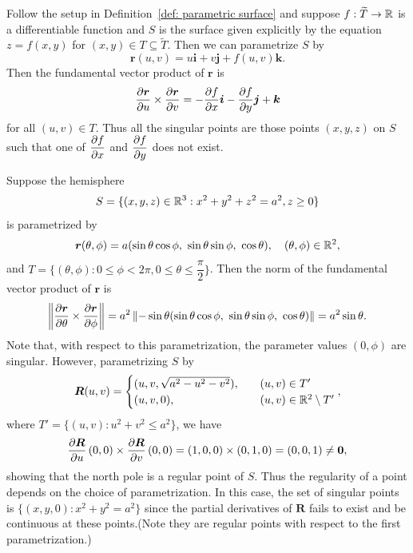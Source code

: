 \begin{exampleenv}\label{example: regularity of a surface given explicitly}
    Follow the setup in Definition~\ref{def: parametric surface} and suppose $f:\widetilde T\to \mathbb{R}$ is a differentiable function and $S$ is the surface given explicitly by the equation $z = f(x,y)$ for $(x,y) \in T \subseteq \widetilde T$. Then we can parametrize $S$ by
    $$ \bm r(u,v) = u\bm i + v\bm j + f(u,v)\bm k. $$
    Then the fundamental vector product of $\bm r$ is
    $$ \dfrac{\partial \bm r}{\partial u}\times \dfrac{\partial \bm r}{\partial v} 
    = -\pdv{f}{x}\bm i - \pdv{f}{y}\bm j + \bm k$$
    for all $(u,v)\in T$. Thus all the singular points are those points $(x,y,z)$ on $S$ such that one of $\displaystyle \pdv{f}{x}(x,y)$ and $\displaystyle \pdv{f}{y}(x,y)$ does not exist.
\end{exampleenv}
\begin{exampleenv}\label{example: regularity depends on parametrization}
    Suppose the hemisphere
    $$ S = \{(x,y,z)\in \mathbb{R}^3: x^2 + y^2 + z^2 = a^2, z \ge 0\} $$
    is parametrized by
    $$ \bm r(\theta, \phi) = a(\sin\theta\cos\phi,\ \sin\theta\sin\phi,\ \cos\theta),\quad (\theta,\phi)\in \R^2, $$
    and $T = \{(\theta, \phi): 0\le \phi < 2\pi, 0\le \theta \le \dfrac{\pi}{2}\}$. Then the norm of the fundamental vector product of $\bm r$ is
    $$ \left\|\pdv{\bm r}{\theta}\times \pdv{\bm r}{\phi} \right\|= a^2 \left\| -\sin\theta
(\sin\theta\cos\phi,\ \sin\theta\sin\phi,\ \cos\theta)\right\|
    = a^2\sin\theta. $$
    Note that, with respect to this parametrization, the parameter values $(0,\phi)$ are singular. However, parametrizing $S$ by
    $$ \bm R(u,v) = \begin{cases}
        (u, v, \sqrt{a^2-u^2-v^2}),\quad &(u,v)\in T'\\
        (u, v, 0), \quad &(u,v)\in \mathbb{R}^2\setminus T' 
    \end{cases}, $$
    where $T' = \{(u,v): u^2 + v^2 \le a^2\}$, we have
    $$ \pdv{\bm R}{u} \left( 0,0 \right) \times \pdv{\bm R}{v} \left( 0,0 \right) =\left( 1,0,0 \right) \times \left( 0,1,0 \right) = \left( 0,0,1 \right) \ne \bm 0, $$
    showing that the north pole is a regular point of $S$. Thus the regularity of a point depends on the choice of parametrization. In this case, the set of singular points is $\{ (x,y,0) : x^2 + y^2 = a^2 \}$ since the partial derivatives of $\bm R$ fails to exist and be continuous at these points.(Note they are regular points with respect to the first parametrization.)
\end{exampleenv}
